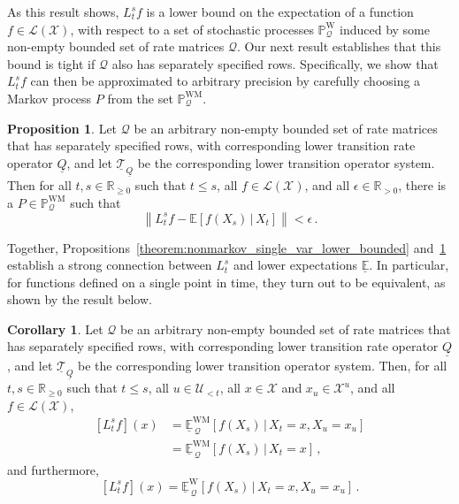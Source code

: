 \documentclass[10pt,a4paper]{paper}
\theoremstyle{definition}
\newtheorem{proposition}[theorem]{Proposition}
\newtheorem{corollary}[theorem]{Corollary}
\newcommand{\reals}{\mathbb{R}}
\newcommand{\realspos}{\reals_{>0}}
\newcommand{\realsnonneg}{\reals_{\geq 0}}
\newcommand{\states}{\mathcal{X}}
\newcommand{\processes}{\mathbb{P}}
\newcommand{\wprocesses}{\processes^{\mathrm{W}}}
\newcommand{\wmprocesses}{\processes^{\mathrm{WM}}}
\newcommand{\lbound}{L}
\newcommand{\gambles}{\mathcal{L}}
\newcommand{\gamblesX}{\gambles(\states)}
\newcommand{\rateset}{\mathcal{Q}}
\newcommand{\lrate}{\underline{Q}}
\newcommand{\norm}[1]{\left\lVert #1 \right\rVert}
\begin{document}
As this result shows, $L_t^sf$ is a lower bound on the expectation of a function $f\in\gamblesX$, with respect to a set of stochastic processes $\wprocesses_\rateset$ induced by some non-empty bounded set of rate matrices $\rateset$. Our next result establishes that this bound is tight if $\rateset$ also has separately specified rows. Specifically, we show that $L_t^sf$ can then be approximated to arbitrary precision by carefully choosing a Markov process $P$ from the set $\wmprocesses_\rateset$.

\begin{proposition}\label{theorem:lower_markov_bound_is_tight}
Let $\rateset$ be an arbitrary non-empty bounded set of rate matrices that has separately specified rows, with corresponding lower transition rate operator $\lrate$, and let $\underline{\mathcal{T}}_{\lrate}$ be the corresponding lower transition operator system. Then for all $t,s\in\realsnonneg$ such that $t\leq s$, all $f\in\gamblesX$, and all $\epsilon\in\realspos$, there is a $P\in\wmprocesses_{\rateset}$ such that
\begin{equation*}
\norm{\lbound_t^sf-\mathbb{E}[f(X_s)\,\vert\,X_t]} < \epsilon\,.
\end{equation*}
\end{proposition}

Together, Propositions~\ref{theorem:nonmarkov_single_var_lower_bounded} and~\ref{theorem:lower_markov_bound_is_tight} establish a strong connection between $L_t^s$ and lower expectations $\underline{\mathbb{E}}$. In particular, for functions defined on a single point in time, they turn out to be equivalent, as shown by the result below.

\begin{corollary}\label{cor:lower_operator_is_infimum}
Let $\rateset$ be an arbitrary non-empty bounded set of rate matrices that has separately specified rows, with corresponding lower transition rate operator $\lrate$, and let $\underline{\mathcal{T}}_{\lrate}$ be the corresponding lower transition operator system. Then, for all $t,s\in\realsnonneg$ such that $t\leq s$, all $u\in\mathcal{U}_{<t}$, all $x\in\states$ and $x_u\in\states^u$, and all $f\in\gamblesX$,
\begin{align*}
\left[L_t^sf\right](x) &= \underline{\mathbb{E}}^{\mathrm{WM}}_{\,\rateset}[f(X_s)\,\vert\,X_t=x,X_u=x_u] \\
 &= \underline{\mathbb{E}}^{\mathrm{WM}}_{\,\rateset}[f(X_s)\,\vert\,X_t=x]\,,
\end{align*}
and furthermore,
\begin{equation*}
\left[L_t^sf\right](x) = \underline{\mathbb{E}}^{\mathrm{W}}_{\,\rateset}[f(X_s)\,\vert\,X_t=x,X_u=x_u]\,.
\end{equation*}
\end{corollary}
\end{document}
